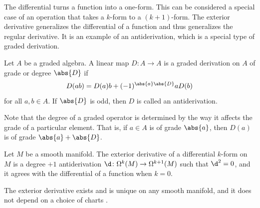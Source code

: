 \documentclass[a4paper,12pt]{article}
\begin{document}
The differential turns a function into a one-form.
This can be considered a special case of an operation that takes a $k$-form to a $(k+1)$-form.
The exterior derivative generalizes the differential of a function and thus generalizes the regular derivative.
It is an example of an antiderivation, which is a special type of graded derivation.
\begin{definition}\label{def:graded_derivation}
    Let $A$ be a graded algebra.
    A linear map $D \colon A \to A$ is a graded derivation on $A$ of grade or degree $\abs{D}$ if
    \begin{equation}
        D(ab) = D(a)b + (-1)^{\abs{a}\abs{D}}aD(b)
    \end{equation}
    for all $a, b \in A$.
    If $\abs{D}$ is odd, then $D$ is called an antiderivation.
\end{definition}
\begin{remark}
    Note that the degree of a graded operator is determined by the way it affects the grade of a particular element.
    That is, if $a \in A$ is of grade $\abs{a}$, then $D(a)$ is of grade $\abs{a} + \abs{D}$.
\end{remark}
\begin{definition}\label{def:exterior_derivative}
    Let $M$ be a smooth manifold.
    The exterior derivative of a differential $k$-form on $M$ is a degree $+1$ antiderivation $\d \colon \Omega^k(M) \to \Omega^{k+1}(M)$ such that $\d^2 = 0$, and it agrees with the differential of a function when $k = 0$.
\end{definition}
\begin{remark}
    The exterior derivative exists and is unique on any smooth manifold, and it does not depend on a choice of charts \cite[Thm.~14.24]{Lee2012}.
\end{remark}
\end{document}

